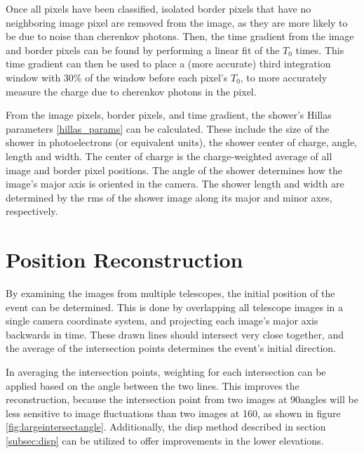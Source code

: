   Once all pixels have been classified, isolated border pixels that have no neighboring image pixel are removed from the image, as they are more likely to be due to noise than cherenkov photons.
  Then, the time gradient from the image and border pixels can be found by performing a linear fit of the $T_{0}$ times.
  This time gradient can then be used to place a (more accurate) third integration window with 30\% of the window before each pixel's $T_{0}$, to more accurately measure the charge due to cherenkov photons in the pixel.

  From the image pixels, border pixels, and time gradient, the shower's Hillas parameters \ref{hillas_params} can be calculated.
  These include the size of the shower in photoelectrons (or equivalent units), the shower center of charge, angle, length and width.
  The center of charge is the charge-weighted average of all image and border pixel positions.
  The angle of the shower determines how the image's major axis is oriented in the camera.
  The shower length and width are determined by the rms of the shower image along its major and minor axes, respectively.

\section{Position Reconstruction}\label{subsec:posrecon}
  By examining the images from multiple telescopes, the initial position of the event can be determined.
  This is done by overlapping all telescope images in a single camera coordinate system, and projecting each image's major axis backwards in time.
  These drawn lines should intersect very close together, and the average of the intersection points determines the event's initial direction.

  In averaging the intersection points, weighting for each intersection can be applied based on the angle between the two lines.
  This improves the reconstruction, because the intersection point from two images at 90\degree angles will be less sensitive to image fluctuations than two images at 160\degree, as shown in figure \ref{fig:largeintersectangle}.
  Additionally, the disp method described in section \ref{subsec:disp} can be utilized to offer improvements in the lower elevations.

